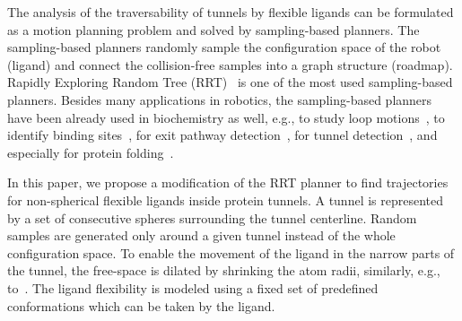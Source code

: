\documentclass[usletter, 10pt, conference]{ieeeconf} %
\begin{document}
The analysis of the traversability of tunnels by flexible ligands can be formulated as a motion planning problem and solved by sampling-based planners.
The sampling-based planners randomly sample the configuration space of the robot (ligand) and connect the collision-free samples into a graph structure (roadmap).
Rapidly Exploring Random Tree (RRT)~\cite{lavalleRRT} is one of the most used sampling-based planners.
Besides many applications in robotics, the sampling-based planners have been already used in biochemistry as well, 
e.g., to study loop motions~\cite{cortes2004geometric}, to identify binding sites~\cite{bayazit2001ligand}, for exit
pathway detection~\cite{cortes2010simulating,cortes2005path}, for tunnel detection~\cite{vonasek2017tunnel}, 
        and especially for protein folding~\cite{raveh2009rapid,amato2002using}. %


In this paper, we propose a modification of the RRT planner to find trajectories for non-spherical flexible ligands inside protein tunnels.
A tunnel is represented by a set of consecutive spheres surrounding the tunnel centerline.
Random samples are generated only around a given tunnel instead of the whole configuration space.
To enable the movement of the ligand in the narrow parts of the tunnel, the free-space is dilated by shrinking the atom radii, similarly, e.g., to~\cite{hsu06multilevel}.  %
The ligand flexibility is modeled using a fixed set of predefined conformations which can be taken by the ligand.
\end{document}
